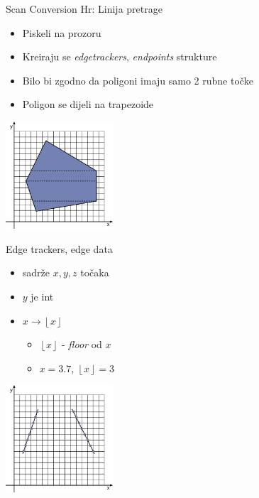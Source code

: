 \documentclass[9pt]{beamer}
\begin{document}
\begin{frame}{Scan Conversion}
	Hr: Linija pretrage
	\begin{itemize}
		\item Piskeli na prozoru
		\item Kreiraju se \textit{edgetrackers}, \textit{endpoints} strukture
		\item Bilo bi zgodno da poligoni imaju samo 2 rubne točke
		\item Poligon se dijeli na trapezoide
	\end{itemize}
	
	\begin{center}
		\includegraphics[height=4cm]{slike/p05_09.png}
	\end{center}
\end{frame}

\begin{frame}{Edge trackers, edge data}
	\begin{itemize}
		\item sadrže  $x, y, z$ točaka
		\item $y$ je int 
		\item $x \rightarrow \left\lfloor x \right\rfloor$
		\begin{itemize}
			\item $\left\lfloor x \right\rfloor$ - \textit{floor} od $x$
			\item $x = 3.7$, $\left\lfloor x \right\rfloor = 3$
		\end{itemize}
	\end{itemize}
	
	\begin{center}
		\includegraphics[height=4cm]{slike/p05_10.png}
	\end{center}
\end{frame}
\end{document}
